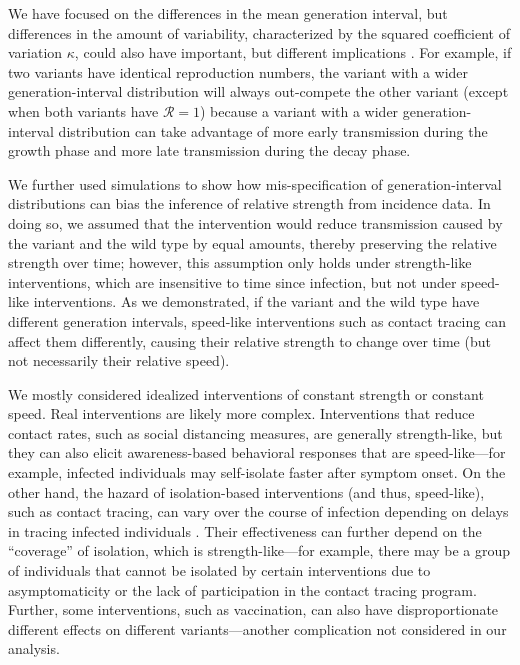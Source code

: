 \documentclass[12pt]{article}
\newcommand{\RR}{\ensuremath{{\mathcal R}}\xspace}
\begin{document}
We have focused on the differences in the mean generation interval, but differences in the amount of variability, characterized by the squared coefficient of variation $\kappa$, could also have important, but different implications \citep{blanquart2021selection}.
For example, if two variants have identical reproduction numbers, the variant with a wider generation-interval distribution will always out-compete the other variant (except when both variants have $\RR=1$) because a variant with a wider generation-interval distribution can take advantage of more early transmission during the growth phase and more late transmission during the decay phase.

We further used simulations to show how mis-specification of generation-interval distributions can bias the inference of relative strength from incidence data.
In doing so, we assumed that the intervention would reduce transmission caused by the variant and the wild type by equal amounts, thereby preserving the relative strength over time;
however, this assumption only holds under strength-like interventions, which are insensitive to time since infection, but not under speed-like interventions. 
As we demonstrated, if the variant and the wild type have different generation intervals, speed-like interventions such as contact tracing can affect them differently, causing their relative strength to change over time (but not necessarily their relative speed).

We mostly considered idealized interventions of constant strength or constant speed.
Real interventions are likely more complex.
Interventions that reduce contact rates, such as social distancing measures, are generally strength-like, but they can also elicit awareness-based behavioral responses that are speed-like---for example, infected individuals may self-isolate faster after symptom onset.
On the other hand, the hazard of isolation-based interventions (and thus, speed-like), such as contact tracing, can vary over the course of infection depending on delays in tracing infected individuals \citep{fraser2004factors,ferretti2020quantifying,scarabel2021renewal}.
Their effectiveness can further depend on the ``coverage'' of isolation, which is strength-like---for example, there may be a group of individuals that cannot be isolated by certain interventions due to asymptomaticity or the lack of participation in the contact tracing program.
Further, some interventions, such as vaccination, can also have disproportionate different effects on different variants---another complication not considered in our analysis. 
\end{document}
